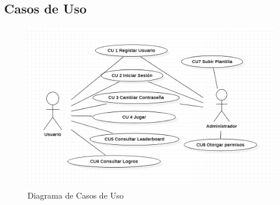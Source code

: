 \documentclass{article}
\begin{document}
\subsection{Casos de Uso}
\begin{figure}[H]
    \centering
    \includegraphics[scale=0.7]{imgs/CasosDeUso}
    \caption{Diagrama de Casos de Uso}
\end{figure}
\end{document}

